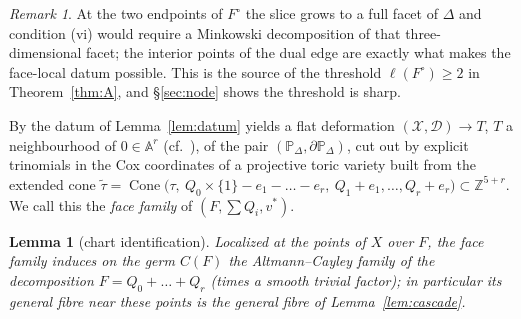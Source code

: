 \documentclass[11pt]{amsart}
\newtheorem{lemma}[theorem]{Lemma}
\theoremstyle{definition}
\theoremstyle{remark}
\newtheorem{remark}[theorem]{Remark}
\newcommand{\ZZ}{\mathbb{Z}}
\newcommand{\PP}{\mathbb{P}}
\newcommand{\Cone}{\operatorname{Cone}}
\begin{document}
\begin{remark}
At the two endpoints of $F^\circ$ the slice grows to a full facet of
$\Delta$ and condition (vi) would require a Minkowski decomposition of
that three-dimensional facet; the interior points of the dual edge are
exactly what makes the face-local datum possible.  This is the source of
the threshold $\ell(F^\circ) \ge 2$ in Theorem~\ref{thm:A}, and
\S\ref{sec:node} shows the threshold is sharp.
\end{remark}

By \cite[Thm.~6.1]{Petracci18} the datum of Lemma~\ref{lem:datum} yields
a flat deformation
$(\mathcal{X}, \mathcal{D}) \to T$, $T$ a neighbourhood of
$0 \in \mathbb{A}^r$ \textup(cf.\ \cite[Rem.~3.6]{Petracci18}\textup), of the pair
$(\PP_\Delta, \partial\PP_\Delta)$, cut out by explicit trinomials in the
Cox coordinates of a projective toric variety built from the extended
cone $\tilde\tau = \Cone\bigl(\tau,\ Q_0\times\{1\} - e_1 - \dots - e_r,\
Q_1 + e_1, \dots, Q_r + e_r\bigr) \subset \ZZ^{5+r}$.  We call this the
\emph{face family} of $(F, \sum Q_i, v^\ast)$.

\begin{lemma}[chart identification]\label{lem:ident}
Localized at the points of $X$ over $F$, the face family induces on the
germ $C(F)$ the Altmann--Cayley family of the decomposition
$F = Q_0 + \dots + Q_r$ \textup{(}times a smooth trivial
factor\textup{)}; in particular its general fibre near these points is
the general fibre of Lemma~\ref{lem:cascade}.
\end{lemma}
\end{document}
